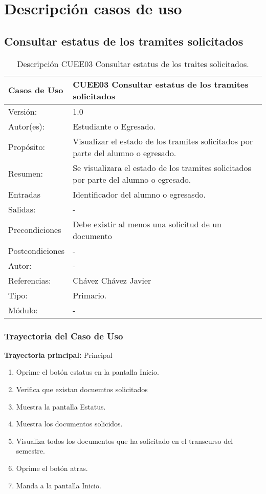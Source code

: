 \section{Descripción casos de uso}

\subsection{Consultar estatus de los tramites solicitados}

\begin{table}[htbp]
\begin{center}
\begin{tabular}{|l|l|}
\hline
Casos de Uso & CUEE03 Consultar estatus de los tramites solicitados \\
\hline \hline
Versión: & 1.0 \\ \hline
Autor(es): & Estudiante o Egresado. \\ \hline
Propósito: & Visualizar el estado de los tramites solicitados por parte del alumno o egresado. \\ \hline
Resumen: & Se visualizara el estado de los tramites solicitados por parte del alumno o egresado.\\ \hline
Entradas & 	Identificador del alumno o egresasdo. \\ \hline
Salidas: & -\\ \hline
Precondiciones & Debe existir al menos una solicitud de un documento\\ \hline
Postcondiciones & -\\ \hline
Autor: & -\\ \hline
Referencias: & Chávez Chávez Javier\\ \hline
Tipo: & Primario.\\ \hline
Módulo: & -\\ \hline
\end{tabular}
\caption{Descripción CUEE03 Consultar estatus de los traites solicitados.}
\label{tabla:sencilla}
\end{center}
\end{table}

\subsubsection{Trayectoria del Caso de Uso}

\textbf{Trayectoria principal:} Principal

\begin{enumerate}
	\item Oprime el botón estatus en la pantalla Inicio.
	\item Verifica que existan docuemtos solicitados
	\item Muestra la pantalla Estatus. 
	\item Muestra los documentos solicidos.
	\item Visualiza todos los documentos que ha solicitado en el transcurso del semestre.
	\item Oprime el botón atras.
	\item Manda a la pantalla Inicio.
\end{enumerate}

